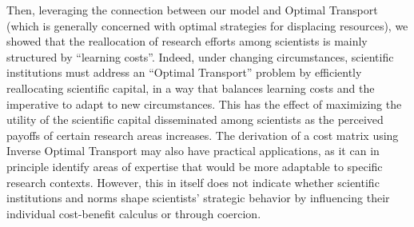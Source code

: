 \documentclass{article}
\begin{document}
Then, leveraging the connection between our model and Optimal Transport (which is generally concerned with optimal strategies for displacing resources), we showed that the reallocation of research efforts among scientists is mainly structured by ``learning costs''. Indeed, under changing circumstances, scientific institutions must address an ``Optimal Transport'' problem by efficiently reallocating scientific capital, in a way that balances learning costs and the imperative to adapt to new circumstances. This has the effect of maximizing the utility of the scientific capital disseminated among scientists as the perceived payoffs of certain research areas increases. The derivation of a cost matrix using Inverse Optimal Transport may also have practical applications, as it can in principle identify areas of expertise that would be more adaptable to specific research contexts. However, this in itself does not indicate whether scientific institutions and norms shape scientists' strategic behavior by influencing their individual cost-benefit calculus or through coercion.
\end{document}
